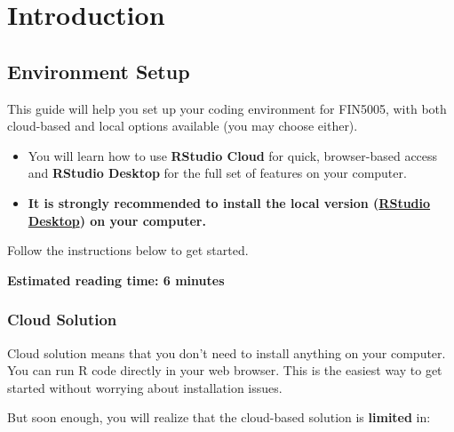 \documentclass[
  12pt,
  letterpaper,
]{scrbook}
\theoremstyle{definition}
\theoremstyle{plain}
\theoremstyle{remark}
\begin{document}
\part{Introduction}

\chapter{Environment Setup}\label{environment-setup}

\begin{tcolorbox}[enhanced jigsaw, arc=.35mm, bottomrule=.15mm, leftrule=.75mm, colback=white, left=2mm, toprule=.15mm, breakable, rightrule=.15mm, colframe=quarto-callout-note-color-frame, opacityback=0]

This guide will help you set up your coding environment for FIN5005,
with both cloud-based and local options available (you may choose
either).

\begin{itemize}
\item
  You will learn how to use \textbf{RStudio Cloud} for quick,
  browser-based access and \textbf{RStudio Desktop} for the full set of
  features on your computer.
\item
  \textbf{It is strongly recommended to install the local version
  (\hyperref[RStudio-Desktop]{RStudio Desktop}) on your computer.}
\end{itemize}

Follow the instructions below to get started.

\textbf{Estimated reading time: 6 minutes}

\end{tcolorbox}

\section{Cloud Solution}\label{cloud-solution}

Cloud solution means that you don't need to install anything on your
computer. You can run R code directly in your web browser. This is the
easiest way to get started without worrying about installation issues.

But soon enough, you will realize that the cloud-based solution is
\textbf{limited} in:
\end{document}
